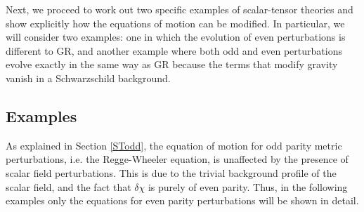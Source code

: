 \documentclass[10pt,twocolumn,preprintnumbers,amsmath,amssymb,nofootinbib
,superscriptaddress]{revtex4-1}
\begin{document}
{Next, we proceed to work out two specific examples of scalar-tensor theories and show explicitly how the equations of motion can be modified. In particular, we will consider two examples: one in which the evolution of even perturbations is different to GR, and another example where both odd and even perturbations evolve exactly in the same way as GR because the terms that modify gravity vanish in a Schwarzschild background. 

\subsection{Examples}

As explained in Section \ref{STodd}, the equation of motion for odd parity metric perturbations, i.e. the Regge-Wheeler equation, is unaffected by the presence of scalar field perturbations. This is due to the trivial background profile of the scalar field, and the fact that $\delta\chi$ is purely of even parity. Thus, in the following examples only the equations for even parity perturbations will be shown in detail.
}
\end{document}
